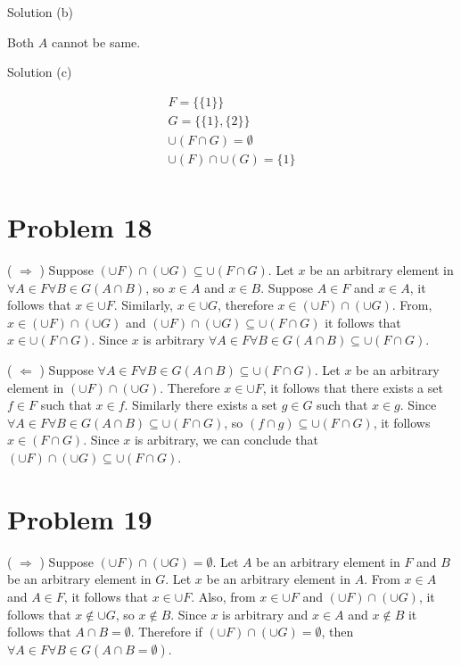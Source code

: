 \documentclass{article}
\begin{document}
Solution (b)

Both $A$ cannot be same.

Solution (c)

\begin{align*}
  F = \{\{1\}\} \\
  G = \{\{1\}, \{2\}\} \\
  \cup (F \cap G) = \emptyset \\
  \cup (F) \cap \cup (G) = \{1\} \\
\end{align*}

\section{Problem 18}

( $\Rightarrow$ ) Suppose $(\cup F) \cap (\cup G) \subseteq \cup (F
\cap G)$. Let $x$ be an arbitrary element in $\forall A \in F \forall
B \in G (A \cap B)$, so $x \in A$ and $x \in B$. Suppose $A \in F$ and
$x \in A$, it follows that $x \in \cup F$. Similarly, $x \in \cup G$,
therefore $x \in (\cup F) \cap (\cup G)$. From, $x \in (\cup F) \cap
(\cup G)$ and $(\cup F) \cap (\cup G) \subseteq \cup (F \cap G)$ it
follows that $x \in \cup (F \cap G).$ Since $x$ is arbitrary $\forall
A \in F \forall B \in G (A \cap B) \subseteq \cup (F \cap G)$.

( $\Leftarrow$ ) Suppose $\forall A \in F \forall B \in G (A \cap B)
\subseteq \cup (F \cap G)$. Let $x$ be an arbitrary element in $(\cup
F) \cap (\cup G)$. Therefore $x \in \cup F$, it follows that there
exists a set $f \in F$ such that $x \in f$. Similarly there exists a
set $g \in G$ such that $x \in g$. Since $\forall A \in F \forall B \in G (A \cap B)
\subseteq \cup (F \cap G)$, so $(f \cap g) \subseteq \cup (F \cap G)$,
it follows $x \in (F \cap G)$. Since $x$ is arbitrary, we can conclude
that $(\cup F) \cap (\cup G) \subseteq \cup(F \cap G)$.

\section{Problem 19}

( $\Rightarrow$ ) Suppose $(\cup F) \cap (\cup G) = \emptyset$. Let
$A$ be an arbitrary element in $F$ and $B$ be an arbitrary element in
$G$. Let $x$ be an arbitrary element in $A$. From $x \in A$ and $A \in
F$, it follows that $x \in \cup F$. Also, from $x \in \cup F$ and
$(\cup F) \cap (\cup G)$, it follows that $x \notin \cup G$, so $x
\notin B$. Since $x$ is arbitrary and $x \in A$ and $x \notin B$ it
follows that $A \cap B = \emptyset$. Therefore if $(\cup F) \cap (\cup
G) = \emptyset$, then $\forall A \in F \forall B \in G (A \cap B =
\emptyset)$.
\end{document}
